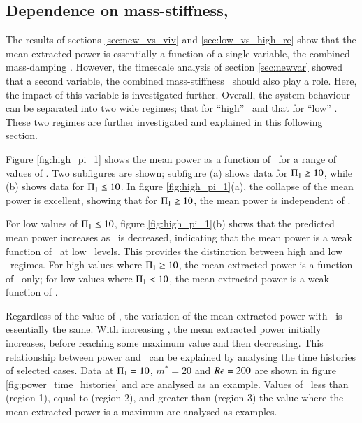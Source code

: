 \subsection{Dependence on mass-stiffness, \massstiff}
\label{sec:massstiff}

The results of sections \ref{sec:new_vs_viv} and \ref{sec:low_vs_high_re} show that the mean extracted power is essentially a function of a single variable, the combined mass-damping \massdamp. However, the timescale analysis of section \ref{sec:newvar} showed that a second variable, the combined mass-stiffness \massstiff\ should also play a role. Here, the impact of this variable is investigated further. Overall, the system behaviour can be separated into two wide regimes; that for ``high'' \massstiff\ and that for ``low'' \massstiff. These two regimes are further investigated and explained in this following section.

Figure \ref{fig:high_pi_1} shows the mean power as a function of \massdamp\ for a range of values of \massstiff. Two subfigures are shown; subfigure (a) shows data for $\Pi_1 \geq 10$, while (b) shows data for $\Pi_1 \leq 10$. In figure \ref{fig:high_pi_1}(a), the collapse of the mean power is excellent, showing that for $\Pi_1 \geq 10$, the mean power is independent of \massstiff.



For low values of $\Pi_1 \leq 10$, figure \ref{fig:high_pi_1}(b) shows that the predicted mean power increases as \massstiff\ is decreased, indicating that the mean power is a weak function of \massstiff\ at low \massstiff\ levels. This provides the distinction between high and low \massstiff\ regimes. For high values where $\Pi_1 \geq 10$, the mean extracted power is a function of \massdamp\ only; for low values where $\Pi_1 < 10$, the mean extracted power is a weak function of \massstiff.

Regardless of the value of \massstiff, the variation of the mean extracted power with \massdamp\ is essentially the same. With increasing \massdamp, the mean extracted power initially increases, before reaching some maximum value and then decreasing. This relationship between power and \massdamp\ can be explained by analysing the time histories of selected cases. Data at $\Pi_1=10$, $m^*=20$ and $Re=200$ are shown in figure \ref{fig:power_time_histories} and are analysed as an example. Values of \massdamp\ less than (region 1), equal to (region 2), and greater than (region 3) the value where the mean extracted power is a maximum are analysed as examples.

